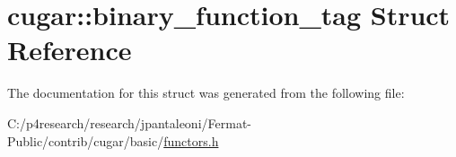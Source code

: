 \hypertarget{structcugar_1_1binary__function__tag}{}\section{cugar\+:\+:binary\+\_\+function\+\_\+tag Struct Reference}
\label{structcugar_1_1binary__function__tag}


The documentation for this struct was generated from the following file\+:\begin{DoxyCompactItemize}
\item 
C\+:/p4research/research/jpantaleoni/\+Fermat-\/\+Public/contrib/cugar/basic/\hyperlink{functors_8h}{functors.\+h}\end{DoxyCompactItemize}

